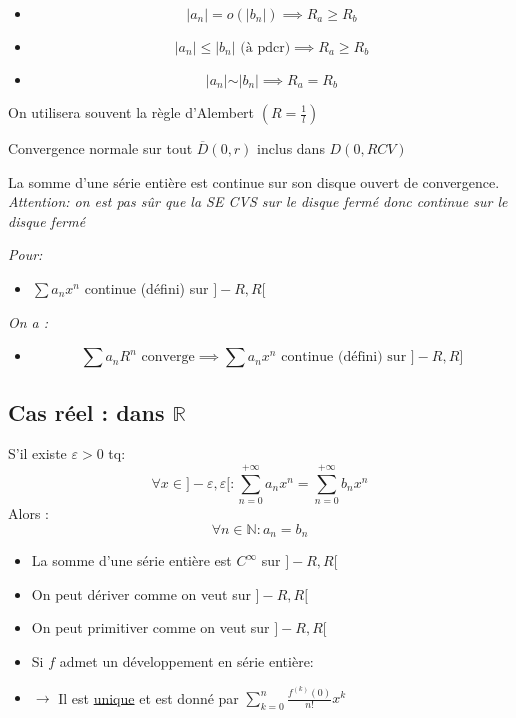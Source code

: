 \documentclass[a4paper,12pt]{report}
\newcommand{\Thm}[2]{\begin{tcolorbox}[colback=white,colframe=Red!60, title=Théorème : #1]#2\end{tcolorbox}}
\newcommand{\Methode}[2]{\begin{tcolorbox}[colback=white, title=Méthode :  #1]#2\end{tcolorbox}}
\def\R{\mathbb{R}}
\def\N{\mathbb{N}}
\newcommand{\eq}[1]{\underset{#1}{\sim}}
\begin{document}
\Thm{Comparaison}{
\begin{itemize}
  \item[] \[|a_n| {=} o(|b_n|) \implies R_a \geq R_b\]
  \item[] \[|a_n| \leq |b_n| \text{ (à pdcr)} \implies R_a \geq R_b\]
  \item[] \[|a_n|\eq{}|b_n| \implies  R_a = R_b\]
\end{itemize}
}

\Methode{En pratique}{
On utilisera souvent la règle d'Alembert $(R=\frac{1}{l})$
}

\Thm{CVN de la série entière}{
Convergence normale sur tout $\overline{D}(0,r)$ inclus dans $D(0,RCV)$ 
}

\Thm{Continuité de la série entière}{
 La somme d'une série entière est continue sur son disque ouvert de convergence.\\
 \textit{Attention: on est pas sûr que la SE CVS sur le disque fermé donc continue sur le disque fermé}
}

\Thm{d'Abel radial}{
\textit{Pour:}
\begin{itemize}
  \item[] \(\sum a_nx^n\) continue (défini) sur $]-R, R[$
\end{itemize}
\textit{On a :}
\begin{itemize}
    \item[] \[\sum a_nR^n \text{ converge} \implies \text{\(\sum a_nx^n\) continue (défini) sur $]-R, R]$}\]
\end{itemize}
}


\subsection{Cas réel : dans $\R$}
\Thm{Unicité de la série entière}{
S’il existe $\varepsilon>0$ tq:
 \[\forall x\in ]-\varepsilon, \varepsilon[ :  \sum_{n=0}^{+\infty}a_nx^n=\sum_{n=0}^{+\infty}b_nx^n \]
 Alors : \[\forall n \in \N : a_n = b_n\]
}

\Thm{En pratique (seulement sur $\R$)}{
\begin{itemize}
\item[] La somme d'une série entière est $C^\infty$ sur $]-R,R[$
\item[] On peut dériver comme on veut sur $]-R,R[$
\item[] On peut primitiver comme on veut sur $]-R,R[$
\item[] Si $f$ admet un développement en série entière: 
\item[] $\rightarrow$ Il est \underline{unique} et est donné par $\sum_{k=0}^n \frac{f^{(k)}(0)}{n!} x^k$
\end{itemize}
}
\end{document}

